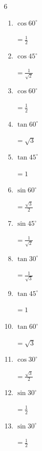 \begin{multicols}{6}
\begin{enumerate}
  \item $\displaystyle \cos{60^\circ}$

        $\displaystyle =\frac{1}{2}$

  \item $\displaystyle \cos{45^\circ}$

        $\displaystyle =\frac{1}{\sqrt{2}}$

  \item $\displaystyle \cos{60^\circ}$

        $\displaystyle =\frac{1}{2}$

\columnbreak %

  \item $\displaystyle \tan{60^\circ}$

        $\displaystyle =\sqrt{3}$

  \item $\displaystyle \tan{45^\circ}$

        $\displaystyle =1$

  \item $\displaystyle \sin{60^\circ}$

        $\displaystyle =\frac{\sqrt{3}}{2}$

  \item $\displaystyle \sin{45^\circ}$

        $\displaystyle =\frac{1}{\sqrt{2}}$

  \item $\displaystyle \tan{30^\circ}$

        $\displaystyle =\frac{1}{\sqrt{3}}$

  \item $\displaystyle \tan{45^\circ}$

        $\displaystyle =1$

  \item $\displaystyle \tan{60^\circ}$

        $\displaystyle =\sqrt{3}$

  \item $\displaystyle \cos{30^\circ}$

        $\displaystyle =\frac{\sqrt{3}}{2}$

  \item $\displaystyle \sin{30^\circ}$

        $\displaystyle =\frac{1}{2}$

  \item $\displaystyle \sin{30^\circ}$

        $\displaystyle =\frac{1}{2}$


\end{enumerate}
\end{multicols}
